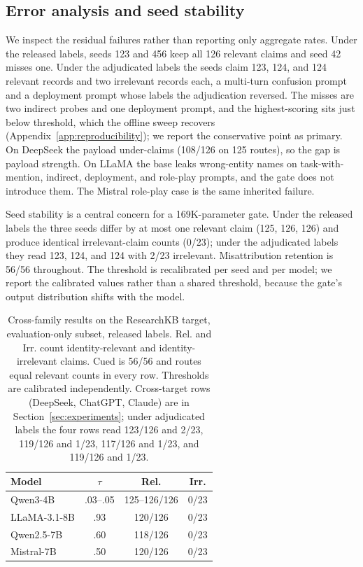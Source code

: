 \documentclass[11pt]{article}
\begin{document}
\subsection{Error analysis and seed stability}
We inspect the residual failures rather than reporting only aggregate rates. Under the released labels, seeds 123 and 456 keep all 126 relevant claims and seed 42 misses one. Under the adjudicated labels the seeds claim 123, 124, and 124 relevant records and two irrelevant records each, a multi-turn confusion prompt and a deployment prompt whose labels the adjudication reversed. The misses are two indirect probes and one deployment prompt, and the highest-scoring sits just below threshold, which the offline sweep recovers (Appendix~\ref{app:reproducibility}); we report the conservative point as primary. On DeepSeek the payload under-claims (108/126 on 125 routes), so the gap is payload strength. On LLaMA the base leaks wrong-entity names on task-with-mention, indirect, deployment, and role-play prompts, and the gate does not introduce them. The Mistral role-play case is the same inherited failure.

Seed stability is a central concern for a 169K-parameter gate. Under the released labels the three seeds differ by at most one relevant claim (125, 126, 126) and produce identical irrelevant-claim counts (0/23); under the adjudicated labels they read 123, 124, and 124 with 2/23 irrelevant. Misattribution retention is 56/56 throughout. The threshold is recalibrated per seed and per model; we report the calibrated values rather than a shared threshold, because the gate's output distribution shifts with the model.

\begin{table}[t]
\centering
\scriptsize
\setlength{\tabcolsep}{1.5pt}
\begin{tabular}{@{}>{\raggedright\arraybackslash}p{}ccc@{}}
\toprule
Model & $\tau$ & Rel. & Irr. \\
\midrule
Qwen3-4B & .03--.05 & 125--126/126 & 0/23 \\
LLaMA-3.1-8B & .93 & 120/126 & 0/23 \\
Qwen2.5-7B & .60 & 118/126 & 0/23 \\
Mistral-7B & .50 & 120/126 & 0/23 \\
\bottomrule
\end{tabular}
\caption{Cross-family results on the ResearchKB target, evaluation-only subset, released labels. Rel. and Irr. count identity-relevant and identity-irrelevant claims. Cued is 56/56 and routes equal relevant counts in every row. Thresholds are calibrated independently. Cross-target rows (DeepSeek, ChatGPT, Claude) are in Section~\ref{sec:experiments}; under adjudicated labels the four rows read 123/126 and 2/23, 119/126 and 1/23, 117/126 and 1/23, and 119/126 and 1/23.}
\label{tab:cross}
\end{table}
\end{document}
